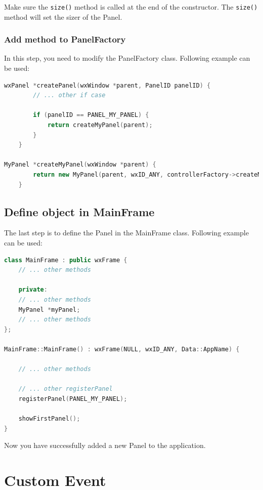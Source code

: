 Make sure the \texttt{size()} method is called at the end of the constructor. The \texttt{size()} method will set the sizer of the Panel.

\subsection{Add method to PanelFactory}

In this step, you need to modify the PanelFactory class. Following example can be used:

\begin{lstlisting}[language=C++, caption={Create Panel method in PanelFactory}]
wxPanel *createPanel(wxWindow *parent, PanelID panelID) {
        // ... other if case

        if (panelID == PANEL_MY_PANEL) {
            return createMyPanel(parent);
        }
    }

MyPanel *createMyPanel(wxWindow *parent) {
        return new MyPanel(parent, wxID_ANY, controllerFactory->createMyController());
    }
\end{lstlisting}

\section{Define object in MainFrame}

The last step is to define the Panel in the MainFrame class. Following example can be used:

\begin{lstlisting}[language=C++, caption={MainFrame class example}]
class MainFrame : public wxFrame {
    // ... other methods

    private:
    // ... other methods
    MyPanel *myPanel;
    // ... other methods
};

MainFrame::MainFrame() : wxFrame(NULL, wxID_ANY, Data::AppName) {

    // ... other methods

    // ... other registerPanel
    registerPanel(PANEL_MY_PANEL);

    showFirstPanel();
}
\end{lstlisting}

Now you have successfully added a new Panel to the application.

\chapter{Custom Event}

